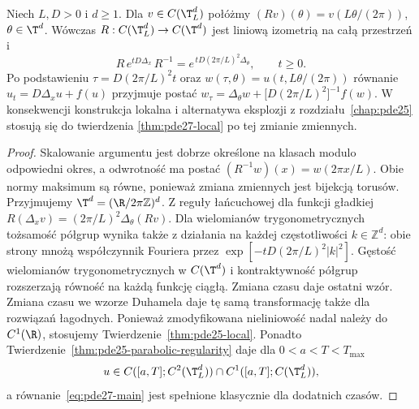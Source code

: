 \begin{stwierdzenie}
\label{prop:pde-v44-torus-scaling}
Niech $L,D>0$ i $d\ge1$. Dla $v\in C(\T_L^d)$ połóżmy
$(Rv)(\theta)=v(L\theta/(2\pi))$, $\theta\in\T^d$.
Wówczas $R:C(\T_L^d)\to C(\T^d)$ jest liniową
izometrią na całą przestrzeń i
\begin{equation}\label{eq:pde-v44-torus-scale}
 R\,e^{tD\Delta_x}\,R^{-1}
 =e^{\,tD(2\pi/L)^2\Delta_\theta},\qquad t\ge0.
\end{equation}
Po podstawieniu $\tau=D(2\pi/L)^2t$ oraz
$w(\tau,\theta)=u(t,L\theta/(2\pi))$ równanie
$u_t=D\Delta_xu+f(u)$ przyjmuje postać
$w_\tau=\Delta_\theta w+\bigl[D(2\pi/L)^2\bigr]^{-1}f(w)$.
W konsekwencji konstrukcja lokalna i alternatywa eksplozji
z rozdziału~\ref{chap:pde25} stosują się do twierdzenia
\ref{thm:pde27-local} po tej zmianie zmiennych.
\end{stwierdzenie}
\begin{proof}
Skalowanie argumentu jest dobrze określone na klasach
modulo odpowiedni okres, a odwrotność ma postać
$(R^{-1}w)(x)=w(2\pi x/L)$. Obie normy maksimum
są równe, ponieważ zmiana zmiennych jest bijekcją torusów.
Przyjmujemy $\T^d=(\R/2\pi\mathbb Z)^d$.
Z reguły łańcuchowej dla funkcji gładkiej
$R(\Delta_xv)=(2\pi/L)^2\Delta_\theta(Rv)$.
Dla wielomianów trygonometrycznych tożsamość półgrup
wynika także z działania na każdej częstotliwości
$k\in\mathbb Z^d$: obie strony mnożą współczynnik
Fouriera przez $\exp[-tD(2\pi/L)^2|k|^2]$.
Gęstość wielomianów trygonometrycznych w $C(\T^d)$
i kontraktywność półgrup rozszerzają równość na każdą
funkcję ciągłą. Zmiana czasu daje ostatni wzór.
Zmiana czasu we wzorze Duhamela daje tę samą
transformację także dla rozwiązań łagodnych.
Ponieważ zmodyfikowana nieliniowość nadal należy do
$C^1(\R)$, stosujemy Twierdzenie~\ref{thm:pde25-local}.
Ponadto Twierdzenie~\ref{thm:pde25-parabolic-regularity}
daje dla $0<a<T<T_{\max}$
\[
 u\in C([a,T];C^2(\T_L^d))\cap C^1([a,T];C(\T_L^d)),
\]
a równanie~\eqref{eq:pde27-main} jest spełnione
klasycznie dla dodatnich czasów.
\end{proof}


